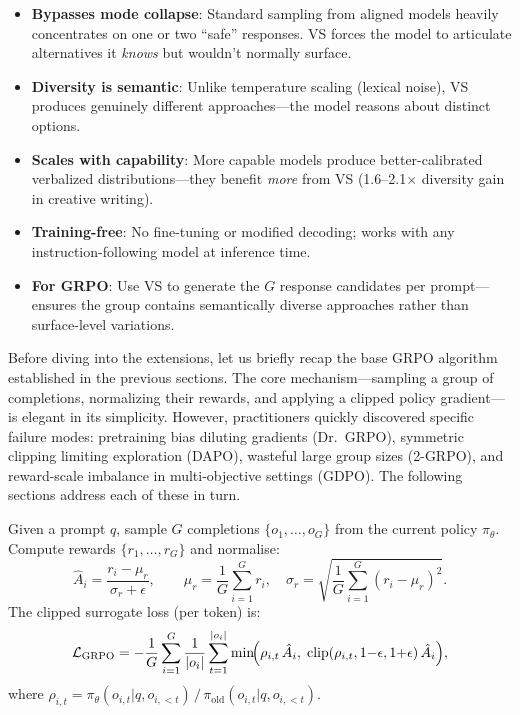 \begin{intuitionbox}
\begin{itemize}
  \item \textbf{Bypasses mode collapse}: Standard sampling from aligned models heavily concentrates on one or two ``safe'' responses. VS forces the model to articulate alternatives it \emph{knows} but wouldn’t normally surface.
  \item \textbf{Diversity is semantic}: Unlike temperature scaling (lexical noise), VS produces genuinely different approaches---the model reasons about distinct options.
  \item \textbf{Scales with capability}: More capable models produce better-calibrated verbalized distributions---they benefit \emph{more} from VS (1.6--2.1$\times$ diversity gain in creative writing).
  \item \textbf{Training-free}: No fine-tuning or modified decoding; works with any instruction-following model at inference time.
  \item \textbf{For GRPO}: Use VS to generate the $G$ response candidates per prompt---ensures the group contains semantically diverse approaches rather than surface-level variations.
\end{itemize}
\end{intuitionbox}

Before diving into the extensions, let us briefly recap the base GRPO algorithm established in the previous sections. The core mechanism---sampling a group of completions, normalizing their rewards, and applying a clipped policy gradient---is elegant in its simplicity. However, practitioners quickly discovered specific failure modes: pretraining bias diluting gradients (Dr.~GRPO), symmetric clipping limiting exploration (DAPO), wasteful large group sizes (2-GRPO), and reward-scale imbalance in multi-objective settings (GDPO). The following sections address each of these in turn.

\begin{keybox}
Given a prompt $q$, sample $G$ completions $\{o_1,\dots,o_G\}$ from the current policy $\pi_\theta$. Compute rewards $\{r_1,\dots,r_G\}$ and normalise: 
\[
\hat{A}_i = \frac{r_i - \mu_r}{\sigma_r + \epsilon}, \qquad
  \mu_r = \frac{1}{G}\sum_{i=1}^G r_i, \quad
  \sigma_r = \sqrt{\frac{1}{G}\sum_{i=1}^G (r_i-\mu_r)^2}.
\]
 The clipped surrogate loss (per token) is: 
\[
\mathcal{L}_{\text{GRPO}} = -\frac{1}{G}\sum_{i=1}^G \frac{1}{|o_i|}
    \sum_{t=1}^{|o_i|}
    \min\!\Bigl(
      \rho_{i,t}\,\hat{A}_i,\;
      \mathrm{clip}(\rho_{i,t},1{-}\epsilon,1{+}\epsilon)\,\hat{A}_i
    \Bigr),
\]
 where $\rho_{i,t} = \pi_\theta(o_{i,t}|q,o_{i,<t})\,/\,\pi_{\text{old}}(o_{i,t}|q,o_{i,<t})$.
\end{keybox}

